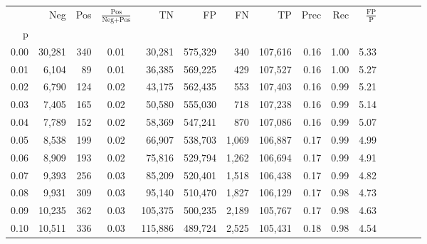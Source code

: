 \begin{tabular}{rrrcrrrrrrrrrrr}
\toprule
{} &     Neg &    Pos & $\frac{\text{Pos}}{\text{Neg}+\text{Pos}}$ &       TN &       FP &       FN &       TP &  Prec &   Rec & $\frac{\text{FP}}{\text{P}}$ \\
p    &         &        &                                            &          &          &          &          &       &       &                              \\
\midrule
0.00 &  30,281 &    340 &                                       0.01 &   30,281 &  575,329 &      340 &  107,616 &  0.16 &  1.00 &                         5.33 \\
0.01 &   6,104 &     89 &                                       0.01 &   36,385 &  569,225 &      429 &  107,527 &  0.16 &  1.00 &                         5.27 \\
0.02 &   6,790 &    124 &                                       0.02 &   43,175 &  562,435 &      553 &  107,403 &  0.16 &  0.99 &                         5.21 \\
0.03 &   7,405 &    165 &                                       0.02 &   50,580 &  555,030 &      718 &  107,238 &  0.16 &  0.99 &                         5.14 \\
0.04 &   7,789 &    152 &                                       0.02 &   58,369 &  547,241 &      870 &  107,086 &  0.16 &  0.99 &                         5.07 \\
0.05 &   8,538 &    199 &                                       0.02 &   66,907 &  538,703 &    1,069 &  106,887 &  0.17 &  0.99 &                         4.99 \\
0.06 &   8,909 &    193 &                                       0.02 &   75,816 &  529,794 &    1,262 &  106,694 &  0.17 &  0.99 &                         4.91 \\
0.07 &   9,393 &    256 &                                       0.03 &   85,209 &  520,401 &    1,518 &  106,438 &  0.17 &  0.99 &                         4.82 \\
0.08 &   9,931 &    309 &                                       0.03 &   95,140 &  510,470 &    1,827 &  106,129 &  0.17 &  0.98 &                         4.73 \\
0.09 &  10,235 &    362 &                                       0.03 &  105,375 &  500,235 &    2,189 &  105,767 &  0.17 &  0.98 &                         4.63 \\
0.10 &  10,511 &    336 &                                       0.03 &  115,886 &  489,724 &    2,525 &  105,431 &  0.18 &  0.98 &                         4.54 \\

\end{tabular}
